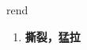 
\begin{frame}
{\huge rend}
\begin{center}
\begin{enumerate}\Large
  \item \textbf{撕裂，猛拉}
\end{enumerate}
\end{center}
\end{frame}
